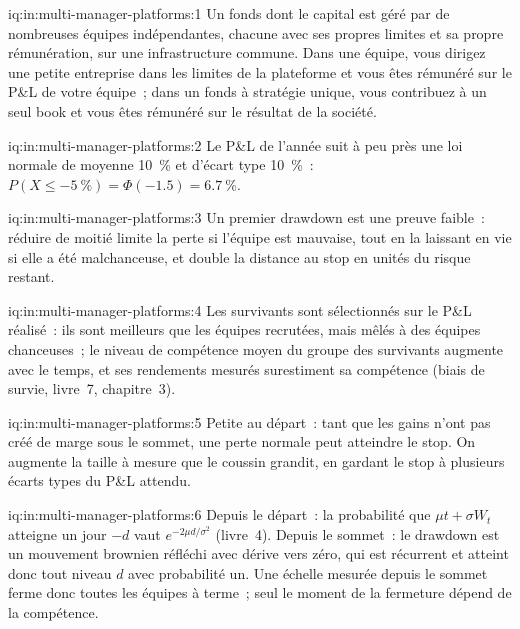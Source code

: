 \begin{solution}{iq:in:multi-manager-platforms:1}
Un fonds dont le capital est géré par de nombreuses équipes indépendantes, chacune avec ses propres limites et sa propre rémunération, sur une infrastructure commune.
Dans une équipe, vous dirigez une petite entreprise dans les limites de la plateforme et vous êtes rémunéré sur le P\&L de votre équipe~; dans un fonds à
stratégie unique, vous contribuez à un seul book et vous êtes rémunéré sur le résultat de la société.
\end{solution}

\begin{solution}{iq:in:multi-manager-platforms:2}
Le P\&L de l'année suit à peu près une loi normale de moyenne 10~\% et d'écart type 10~\%~: $P(X\le-5~\%)=\Phi(-1.5)=6.7~\%$.
\end{solution}

\begin{solution}{iq:in:multi-manager-platforms:3}
Un premier drawdown est une preuve faible~: réduire de moitié limite la perte si l'équipe est mauvaise, tout en la laissant en vie si elle a été
malchanceuse, et double la distance au stop en unités du risque restant.
\end{solution}

\begin{solution}{iq:in:multi-manager-platforms:4}
Les survivants sont sélectionnés sur le P\&L réalisé~: ils sont meilleurs que les équipes recrutées, mais mêlés à des équipes chanceuses~; le
niveau de compétence moyen du groupe des survivants augmente avec le temps, et ses rendements mesurés surestiment sa compétence (biais de
survie, livre~7, chapitre~3).
\end{solution}

\begin{solution}{iq:in:multi-manager-platforms:5}
Petite au départ~: tant que les gains n'ont pas créé de marge sous le sommet, une perte normale peut atteindre le stop. On augmente la taille à mesure que le coussin
grandit, en gardant le stop à plusieurs écarts types du P\&L attendu.
\end{solution}

\begin{solution}{iq:in:multi-manager-platforms:6}
Depuis le départ~: la probabilité que $\mu t+\sigma W_t$ atteigne un jour $-d$ vaut $e^{-2\mu d/\sigma^2}$ (livre~4). Depuis le sommet~:
le drawdown est un mouvement brownien réfléchi avec dérive vers zéro, qui est récurrent et atteint donc tout niveau $d$ avec
probabilité un. Une échelle mesurée depuis le sommet ferme donc toutes les équipes à terme~; seul le moment de la fermeture dépend de la compétence.
\end{solution}
